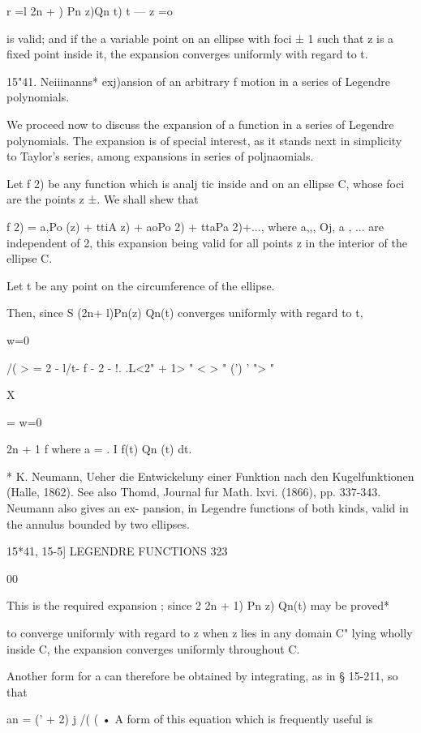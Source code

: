 {{{r =l  2n +  ) Pn z)Qn t) 
t — z  =o 

is valid; and if the a variable point on an ellipse with foci ± 1 such that z is 
a fixed point inside it, the expansion converges uniformly with regard to t. 

15"41. Neiiinanns* exj)ansion of an arbitrary f motion in a series of 
Legendre polynomials.   

We proceed now to discuss the expansion of a function in a series of 
Legendre polynomials. The expansion is of special interest, as it stands next 
in simplicity to Taylor's series, among expansions in series of poljnaomials. 

Let f 2) be any function which is analj tic inside and on an ellipse C, 
whose foci are the points z  ±.  We shall shew that 

f 2) = a,Po (z) + ttiA  z) + aoPo  2) + ttaPa  2)+..., 
where a,,, Oj, a , ... are independent of 2, this expansion being valid for all 
points z in the interior of the ellipse C. 

Let t be any point on the circumference of the ellipse. 

Then, since S (2n+ l)Pn(z) Qn(t) converges uniformly with regard to t, 

w=0 

/( > = 2 - l/t- f - 2 -  !. .L<2" + 1>  " < >  " (') ' "> " 

X 

= %
w=0 

2n + 1 f 
where a  =   . I f(t) Qn (t) dt. 

* K. Neumann, Ueher die Entwickeluny einer Funktion nach den Kugelfunktionen (Halle, 
1862). See also Thomd, Journal fur Math. lxvi. (1866), pp. 337-343. Neumann also gives an ex- 
pansion, in Legendre functions of both kinds, valid in the annulus bounded by two ellipses. 



15*41, 15-5] LEGENDRE FUNCTIONS 323 

00 

This is the required expansion ; since 2  2n + 1) Pn z) Qn(t) may be proved* 

to converge uniformly with regard to z when z lies in any domain C" lying 
wholly inside C, the expansion converges uniformly throughout C. 

Another form for a  can therefore be obtained by integrating, as in 
§ 15-211, so that 

an = ('  + 2) j /(    (   • 
A form of this equation which is frequently useful is 



}}}
